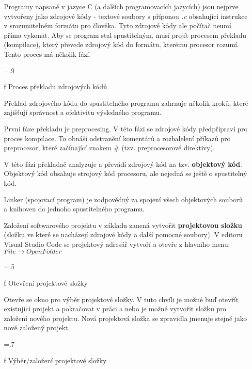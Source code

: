 Programy napsané v jazyce C (a dalších programovacích jazycích) jsou nejprve vytvořeny jako zdrojové kódy - textové soubory s příponou {\it .c} obsahující instrukce v srozumitelném formátu pro člověka. Tyto zdrojové kódy ale počítač neumí přímo vykonat. Aby se program stal spustitelným, musí projít procesem překladu (kompilace), který převede zdrojový kód do formátu, kterému procesor rozumí. Tento proces má několik fází.

\vskip 5mm
\picw=.9\hsize \centerline{ }\nobreak\medskip
\caption/f Proces překladu zdrojových kódů

Překlad zdrojového kódu do spustitelného programu zahrnuje několik kroků, které zajišťují správnost a efektivitu výsledného programu.

První fáze překladu je preprocesing. V této fázi se zdrojové kódy předpřipraví pro proces kompilace. To obnáší odstranění komentárů a rozbalelení příkazů pro preprocesor, které začínající znakem \# (tzv. preprocesorové direktivy).

V této fázi překladač analyzuje a převádí zdrojový kód na tzv. {\bf objektový kód}. Objektový kód obsahuje strojový kód procesoru, ale nejedná se ještě o spustitelný kód.

Linker (spojovací program) je zodpovědný za spojení všech objektových souborů a knihoven do jednoho spustitelného programu.

Založení softwarového projektu v základu zanená vytvořit {\bf projektovou složku} (složku ve které se nacházejí zdrojové kódy a další pomocné soubory). V editoru Visual Studio Code se projektový adresář vytvoří a otevře z hlavního menu: $ File \rightarrow Open Folder$

\vskip 5mm
\picw=.5\hsize \centerline{ }\nobreak\medskip
\caption/f Otevření projektové složky

Otevře se okno pro výběr projektové složky. V tuto chvíli je možné buď otevřít existující projekt a pokračovat v práci a nebo je možné vytvořit složku pro založení nového projektu. Nová projektová složka se zpravidla jmenuje stejně jako nově založený projekt.

\vskip 5mm
\picw=.7\hsize \centerline{ }\nobreak\medskip
\caption/f Výběr/založení projektové složky

